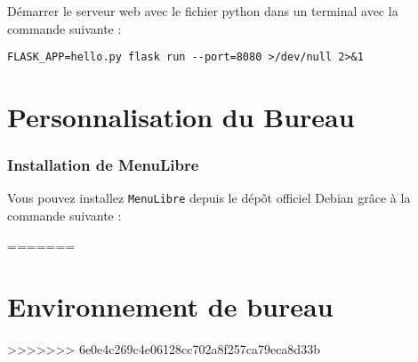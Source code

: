 Démarrer le serveur web avec le fichier python dans un terminal avec la commande suivante :
\begin{lstlisting}
FLASK_APP=hello.py flask run --port=8080 >/dev/null 2>&1
\end{lstlisting}

\chapter{Personnalisation du Bureau}

\subsection{Installation de MenuLibre}

Vous pouvez installez \texttt{MenuLibre} depuis le dépôt officiel Debian grâce à la commande suivante :



=======
\chapter{Environnement de bureau}
>>>>>>> 6e0e4c269c4e06128cc702a8f257ca79eca8d33b
